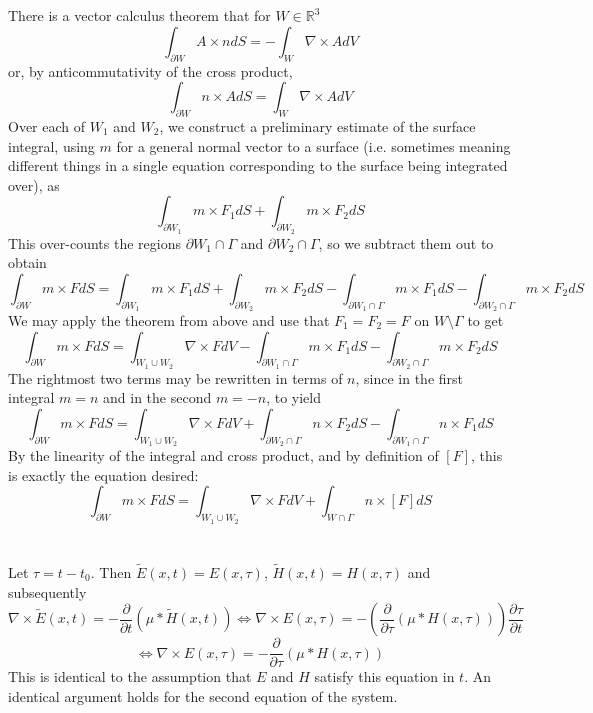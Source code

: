 \documentclass{article}
\begin{document}
\section{}
There is a vector calculus theorem that for $W\in\mathbb{R}^3$
\[\int_{\partial W} A\times ndS = -\int_W\nabla\times AdV\]
or, by anticommutativity of the cross product,
\[\int_{\partial W} n\times AdS  = \int_W\nabla\times AdV\]
Over each of $W_1$ and $W_2$, we construct a preliminary estimate of the surface integral, using $m$ for a general normal vector to a surface (i.e. sometimes meaning different things in a single equation corresponding to the surface being integrated over), as
\[\int_{\partial W_1}m\times F_1dS+\int_{\partial W_2}m\times F_2dS\]
This over-counts the regions $\partial W_1\cap\Gamma$ and $\partial W_2\cap\Gamma$, so we subtract them out to obtain
\[\int_{\partial W}m\times FdS=\int_{\partial W_1}m\times F_1dS+\int_{\partial W_2}m\times F_2dS - \int_{\partial W_1\cap\Gamma}m\times F_1dS -\int_{\partial W_2\cap\Gamma}m\times F_2dS\]
We may apply the theorem from above and use that $F_1=F_2=F$ on $W\setminus\Gamma$ to get
\[\int_{\partial W}m\times FdS=\int_{W_1\cup W_2}\nabla\times FdV - \int_{\partial W_1\cap\Gamma}m\times F_1dS -\int_{\partial W_2\cap\Gamma}m\times F_2dS\]
The rightmost two terms may be rewritten in terms of $n$, since in the first integral $m=n$ and in the second $m=-n$, to yield
\[\int_{\partial W}m\times FdS=\int_{W_1\cup W_2}\nabla\times FdV+\int_{\partial W_2\cap\Gamma}n\times F_2dS-\int_{\partial W_1\cap\Gamma}n\times F_1dS\]
By the linearity of the integral and cross product, and by definition of $[F]$, this is exactly the equation desired:
\[\int_{\partial W}m\times FdS=\int_{W_1\cup W_2}\nabla\times FdV+\int_{W\cap\Gamma}n\times[F]dS\]
\section{}

\section{}
Let $\tau = t-t_0$. Then $\tilde{E}(x,t)=E(x,\tau)$, $\tilde{H}(x,t)=H(x,\tau)$ and subsequently
\[\nabla \times \tilde{E}(x,t) = -\frac{\partial}{\partial t}(\mu*\tilde{H}(x,t)) \Leftrightarrow \nabla\times E(x,\tau)=-\left( \frac{\partial}{\partial\tau}(\mu*H(x,\tau))\right)\frac{\partial\tau}{\partial t}\]
\[\Leftrightarrow \nabla \times E(x,\tau)=-\frac{\partial}{\partial\tau}(\mu*H(x,\tau))\]
This is identical to the assumption that $E$ and $H$ satisfy this equation in $t$.
An identical argument holds for the second equation of the system.
\end{document}
